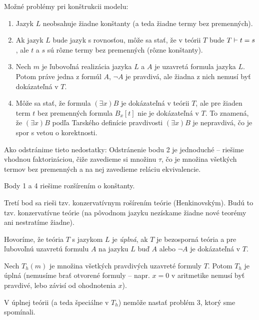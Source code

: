 Možné problémy pri konštrukcii modelu:
\begin{enumerate}
    \item Jazyk $L$ neobsahuje žiadne konštanty (a teda žiadne termy bez
            premenných).
    \item Ak jazyk $L$ bude jazyk s rovnosťou, môže sa stať, že v teórii $T$
            bude $T \vdash t=s$, ale $t$ a $s$ sú rôzne termy bez
            premenných (rôzne konštanty).
    \item Nech $m$ je ľubovoľná realizácia jazyka $L$ a $A$ je uzavretá
            formula jazyka $L$. Potom práve jedna z formúl $A$, $\neg A$ je
            pravdivá, ale žiadna z nich nemusí byť dokázateľná v $T$.
    \item Môže sa stať, že formula $(\exists x)B$ je dokázateľná v teórii
            $T$, ale pre žiaden term $t$ bez premenných formula $B_x[t]$ nie
            je dokázateľná v $T$. To znamená, že $(\exists x)B$ 
            podľa Tarského definície pravdivosti $(\exists x)B$ je
            nepravdivá, čo je spor s vetou o korektnosti.
\end{enumerate}

Ako odstránime tieto nedostatky:
Odstránenie bodu 2 je jednoduché -- riešime vhodnou faktorizáciou, čiže
zavedieme si množinu $\tau$, čo je množina všetkých termov bez premenných
a na nej zavedieme reláciu ekvivalencie.

Body 1 a 4 riešime rozšírením o konštanty.

Tretí bod sa rieši tzv. konzervatívnym rošírením teórie (Henkinovským).
Budú to tzv.  konzervatívne teórie (na pôvodnom jazyku nezískame žiadne nové
teorémy ani nestratíme žiadne).

\begin{definicia} %
    Hovoríme, že teória $T$ s jazykom $L$ je \emph{úplná}, ak $T$ je
    bezosporná teória a pre ľubovoľnú uzavretú formulu $A$ na jazyku
    $L$ buď $A$ alebo $\neg A$ je dokázateľná v $T$.
\end{definicia}

\par Nech $T_h(m)$ je množina všetkých pravdivých uzavreté formuly $T$. 
Potom $T_h$ je úplná (nemusíme brať otvorené formuly 
-- napr. $x=0$ v aritmetike nemusí byť pravdivé, 
lebo závisí od ohodnotenia $x$).

\begin{poznamka}
 V úplnej teórii (a teda špeciálne v $T_h$) nemôže nastať problém 3,
 ktorý sme spomínali.
\end{poznamka}

